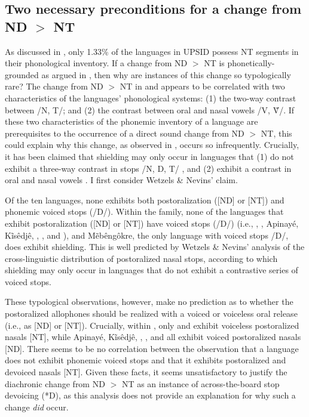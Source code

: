 \documentclass[output=paper,hidelinks]{langscibook}
\begin{document}
\subsection{Two necessary preconditions for a change from ND $>$ NT}
\begin{sloppypar}
As discussed in , only 1.33\% of the languages in UPSID possess NT segments in their phonological inventory. If a change from ND $>$ NT is phonetically-grounded as argued in , then why are instances of this change so typologically rare? The change from ND $>$ NT in  and  appears to be correlated with two characteristics of the languages' phonological systems: (1) the two-way contrast between /N, T/; and (2) the contrast between oral and nasal vowels /V, \~V/. If these two characteristics of the phonemic inventory of a language are prerequisites to the occurrence of a direct sound change from ND $>$ NT, this could explain why this change, as observed in , occurs so infrequently. Crucially, it has been claimed that shielding may only occur in languages that (1) do not exhibit a three-way contrast in stops /N, D, T/ \citep{WetzelsNevins2018}, and (2) exhibit a contrast in oral and nasal vowels \citep{Hyman1975, herbert1986, stanton2017}. I first consider Wetzels \& Nevins' claim.
\end{sloppypar}

Of the ten  languages, none exhibits both postoralization ([ND] or [NT]) and phonemic voiced stops (/D/). Within the family, none of the languages that exhibit postoralization ([ND] or [NT]) have voiced stops (/D/) (i.e., , , Apinay\'e, K\~is\^edj\^e, , , and ), and M\~eb\^eng\^okre, the only language with voiced stops /D/, does exhibit shielding. This is well predicted by Wetzels \& Nevins' analysis of the cross-linguistic distribution of postoralized nasal stops, according to which shielding may only occur in languages that do not exhibit a contrastive series of voiced stops.

These typological observations, however, make no prediction as to whether the postoralized allophones should be realized with a voiced or voiceless oral release (i.e., as [ND] or [NT]). Crucially, within , only  and  exhibit voiceless postoralized nasals [NT], while Apinay\'e, K\~is\^edj\^e, , , and  all exhibit voiced postoralized nasals [ND]. There seems to be no correlation between the observation that a language does not exhibit phonemic voiced stops and that it exhibits postoralized and devoiced nasals [NT]. Given these facts, it seems unsatisfactory to justify the diachronic change from ND $>$ NT as an instance of across-the-board stop devoicing (*D), as this analysis does not provide an explanation for why such a change \textit{did} occur.
\end{document}
